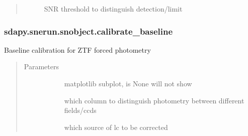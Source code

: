 \documentclass[letterpaper,10pt,english]{sphinxmanual}
\begin{document}
\begin{fulllineitems}
\begin{fulllineitems}
\begin{quote}
\begin{description}
\begin{description}
\item[{}] \leavevmode{[}\sphinxtitleref{float}{]}
SNR threshold to distinguish detection/limit

\end{description}

\end{description}\end{quote}

\end{fulllineitems}



\subsubsection{sdapy.snerun.snobject.calibrate\_baseline}
\label{\detokenize{generated/sdapy.snerun.snobject.calibrate_baseline:sdapy-snerun-snobject-calibrate-baseline}}\label{\detokenize{generated/sdapy.snerun.snobject.calibrate_baseline::doc}}

\begin{fulllineitems}
\label{\detokenize{generated/sdapy.snerun.snobject.calibrate_baseline:sdapy.snerun.snobject.calibrate_baseline}}
Baseline calibration for ZTF forced photometry
\begin{quote}\begin{description}
\item[{Parameters}] \leavevmode\begin{description}
\item[{}] \leavevmode{[}\sphinxtitleref{matplotlib.axes}{]}
matplotlib subplot, is None will not show

\item[{}] \leavevmode{[}\sphinxtitleref{str}{]}
which column to distinguish photometry between different fields/ccds

\item[{}] \leavevmode{[}\sphinxtitleref{str}{]}
which source of lc to be corrected


\end{description}
\end{description}
\end{quote}
\end{fulllineitems}
\end{fulllineitems}
\end{document}
